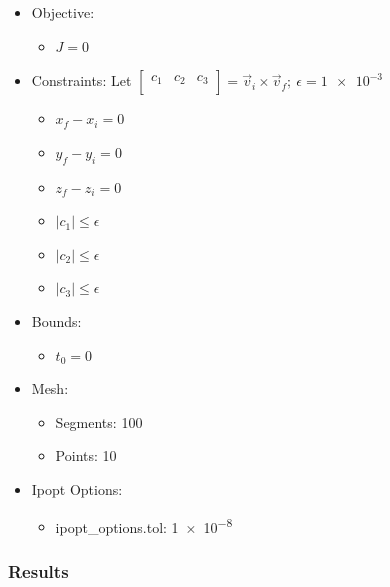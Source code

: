 \documentclass{article}
\begin{document}
\begin{itemize}
    \item Objective:
    \begin{itemize}
        \item $J = 0$
    \end{itemize}
    \item Constraints: Let $\left[\begin{matrix}c_1&c_2&c_3\\\end{matrix}\right] = \vec{v}_i\times\vec{v}_f;\ \epsilon = \num{1e-3}$
    \begin{itemize}
        \item $x_f - x_i = 0$
        \item $y_f - y_i = 0$
        \item $z_f - z_i = 0$
        \item $\left|c_1\right| \leq \epsilon$
        \item $\left|c_2\right| \leq \epsilon$
        \item $\left|c_3\right| \leq \epsilon$
    \end{itemize}
    \item Bounds:
    \begin{itemize}
        \item $t_0 = 0$
    \end{itemize}
    \item Mesh:
    \begin{itemize}
        \item Segments: 100
        \item Points: 10
    \end{itemize}
    \item Ipopt Options:
    \begin{itemize}
        \item ipopt\_options.tol: \num{1e-8}
    \end{itemize}
\end{itemize}

\subsubsection{Results}
\end{document}
